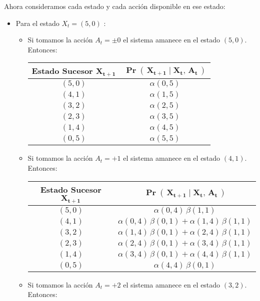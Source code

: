 \documentclass[ a4paper, twoside, 11pt]{article}
\begin{document}
\begin{problem}
Ahora consideramos cada estado y cada acci\'on disponible en ese estado: 
\begin{itemize}
\item Para el estado $X_t = (5,0)$ :
\begin{itemize}
\item Si tomamos la acci\'on $A_t = \pm 0$ el sistema amanece en el estado $(5,0)$. Entonces: 
\begin{table}[H]
\centering
\begin{tabular}{|c|c|}
\hline
\textbf{Estado Sucesor} $\boldsymbol{X_{t+1}}$
& $\boldsymbol{\Pr( \, X_{t+1} \mid X_t, \, A_t \, )}$ \\ \hline
$(5,0)$ & $\alpha(0,5)$ \\ \hline
$(4,1)$ & $\alpha(1,5)$ \\ \hline
$(3,2)$ & $\alpha(2,5)$ \\ \hline
$(2,3)$ & $\alpha(3,5)$ \\ \hline
$(1,4)$ & $\alpha(4,5)$ \\ \hline
$(0,5)$ & $\alpha(5,5)$ \\ \hline
\end{tabular}
\end{table}
\item Si tomamos la acci\'on $A_t = +1$ el sistema amanece en el estado $(4,1)$. Entonces: 
\begin{table}[H]
\centering
\begin{tabular}{|c|c|}
\hline
\textbf{Estado Sucesor} $\boldsymbol{X_{t+1}}$
& $\boldsymbol{\Pr( \, X_{t+1} \mid X_t, \, A_t \, )}$ \\ \hline
$(5,0)$ & $\alpha(0,4) \, \beta(1,1)$ \\ \hline
$(4,1)$ & $\alpha(0,4) \, \beta(0,1) + \alpha(1,4) \, \beta(1,1)$ \\ \hline
$(3,2)$ & $\alpha(1,4) \, \beta(0,1) + \alpha(2,4) \, \beta(1,1)$ \\ \hline
$(2,3)$ & $\alpha(2,4) \, \beta(0,1) + \alpha(3,4) \, \beta(1,1)$ \\ \hline
$(1,4)$ & $\alpha(3,4) \, \beta(0,1) + \alpha(4,4) \, \beta(1,1)$ \\ \hline
$(0,5)$ & $\alpha(4,4) \, \beta(0,1)$ \\ \hline
\end{tabular}
\end{table}
\item Si tomamos la acci\'on $A_t = +2$ el sistema amanece en el estado $(3,2)$. Entonces: 

\end{itemize}
\end{itemize}
\end{problem}
\end{document}
